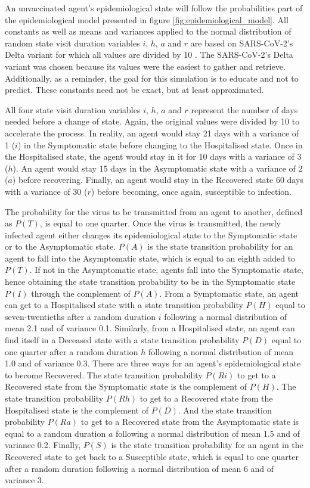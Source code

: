 An unvaccinated agent's epidemiological state will follow the probabilities part of the epidemiological model presented in figure \ref{fig:epidemiological_model}.
All constants as well as means and variances applied to the normal distribution of random state visit duration variables $i$, $h$, $a$ and $r$ are based on SARS-CoV-2's Delta variant for which all values are divided by 10 \cite{rozier_covidtracker_nodate, altarawneh_protection_2022, wong_high_2020, faes_time_2020}. The SARS-CoV-2's Delta variant was chosen because its values were the easiest to gather and retrieve. Additionally, as a reminder, the goal for this simulation is to educate and not to predict. These constants need not be exact, but at least approximated.

All four state visit duration variables $i$, $h$, $a$ and $r$ represent the number of days needed before a change of state. Again, the original values were divided by 10 to accelerate the process. In reality, an agent would stay 21 days with a variance of 1 ($i$) in the Symptomatic state before changing to the Hospitalised state. Once in the Hospitalised state, the agent would stay in it for 10 days with a variance of 3 ($h$). An agent would stay 15 days in the Asymptomatic state with a variance of 2 ($a$) before recovering. Finally, an agent would stay in the Recovered state 60 days with a variance of 30 ($r$) before becoming, once again, susceptible to infection.

The probability for the virus to be transmitted from an agent to another, defined as $P(T)$, is equal to one quarter. Once the virus is transmitted, the newly infected agent either changes its epidemiological state to the Symptomatic state or to the Asymptomatic state. $P(A)$ is the state transition probability for an agent to fall into the Asymptomatic state, which is equal to an eighth added to $P(T)$. If not in the Asymptomatic state, agents fall into the Symptomatic state, hence obtaining the state transition probability to be in the Symptomatic state $P(I)$ through the complement of $P(A)$. From a Symptomatic state, an agent can get to a Hospitalised state with a state transition probability $P(H)$ equal to seven-twentieths after a random duration $i$ following a normal distribution of mean 2.1 and of variance 0.1. Similarly, from a Hospitalised state, an agent can find itself in a Deceased state with a state transition probability $P(D)$ equal to one quarter after a random duration $h$ following a normal distribution of mean 1.0 and of variance 0.3. There are three ways for an agent's epidemiological state to become Recovered. The state transition probability $P(Ri)$ to get to a Recovered state from the Symptomatic state is the complement of $P(H)$. The state transition probability $P(Rh)$ to get to a Recovered state from the Hospitalised state is the complement of $P(D)$. And the state transition probability $P(Ra)$ to get to a Recovered state from the Asymptomatic state is equal to a random duration $a$ following a normal distribution of mean 1.5 and of variance 0.2. Finally, $P(S)$ is the state transition probability for an agent in the Recovered state to get back to a Susceptible state, which is equal to one quarter after a random duration following a normal distribution of mean 6 and of variance 3.

